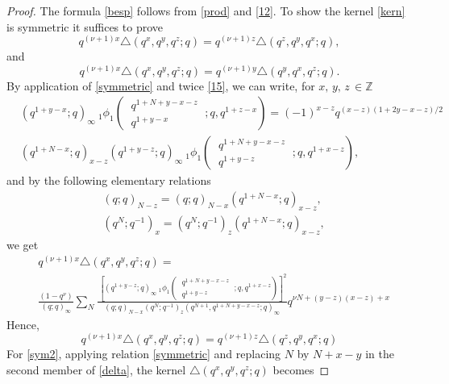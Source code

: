 \documentclass[12pt,a4paper]{amsart}
\numberwithin{equation}{section}
\theoremstyle{plain}
\theoremstyle{definition}
\theoremstyle{remark}
\numberwithin{equation}{section}
\numberwithin{table}{section}
\numberwithin{figure}{section}
\begin{document}
\begin{proof}The formula \eqref{besp} follows from \eqref{prod}
and \eqref{12}. To show the kernel \eqref{kern} is symmetric it
suffices to prove
\begin{equation}
q^{(\nu+1)x}\triangle(q^x,q^y,q^z;q)=q^{(\nu+1)z}\triangle(q^z,q^y,q^x;q),
\end{equation}
and
\begin{equation}
q^{(\nu+1)x}\triangle(q^x,q^y,q^z;q)=q^{(\nu+1)y}\triangle(q^y,q^x,q^z;q).\label{sym2}
\end{equation}
By application of \eqref{symmetric} and twice \eqref{15}, we can
write, for $x,\,y,\,z\, \in \mathbb{Z}$
\begin{align*}
&(q^{1+y-x};q)_{\infty}\ _{1}\phi_1\left(\begin{matrix} \ q^{1+N+y-x-z}\  \\
\ q^{1+y-x}\end{matrix};q,q^{1+z-x}\right)=(-1)^{x-z}q^{(x-z)(1+2y-x-z)/2}\\&(q^{1+N-x};q)_{x-z}(q^{1+y-z};q)_{\infty}
\ _{1}\phi_1\left(\begin{matrix} \ q^{1+N+y-x-z}\  \\
\ q^{1+y-z}\end{matrix};q,q^{1+x-z}\right),
\end{align*}
and by the following elementary relations
\begin{align*}
&(q;q)_{N-z}=(q;q)_{N-x}(q^{1+N-x};q)_{x-z},\\&
(q^{N};q^{-1})_{x}=(q^{N};q^{-1})_{z}(q^{1+N-x};q)_{x-z},
\end{align*}
we get
\begin{align*}
&q^{(\nu+1)x}\triangle(q^x,q^y,q^z;q)=\\&
\frac{(1-q^{\nu})}{(q;q)_{\infty}} \sum_{N}\frac{\,\left[(q^{1+y-z};q)_{\infty}\ _{1}\phi_1\left(\begin{matrix} \ q^{1+N+y-x-z}\  \\
\ q^{1+y-z}\end{matrix};q,q^{1+x-z}\right)
\right]^2
}{(q;q)_{N-x}(q^{N};q^{-1})_{z}(q^{N+1},q^{1+N+y-x-z};q)_{\infty}}
q^{\nu N+(y-z)(x-z)+x}
\end{align*}
Hence,
\begin{equation*}
q^{(\nu+1)x}\triangle(q^x,q^y,q^z;q)=q^{(\nu+1)z}\triangle(q^z,q^y,q^x;q)
\end{equation*}
For \eqref{sym2}, applying relation  \eqref{symmetric} and replacing
$N$ by $N+x-y$ in the second member of \eqref{delta}, the kernel
$\triangle(q^x,q^y,q^z;q)$ becomes

\end{proof}
\end{document}
